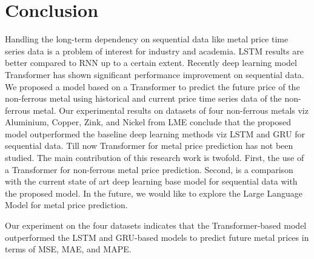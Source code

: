 \documentclass[preprint,12pt]{elsarticle}
\begin{document}
\section{Conclusion}
Handling the long-term dependency on sequential data like metal price time series data is a problem of interest for industry and academia. LSTM results are better compared to RNN up to a certain extent. Recently deep learning model Transformer has shown significant performance improvement on sequential data. We proposed a model based on a Transformer to predict the future price of the non-ferrous metal using historical and current price time series data of the non-ferrous metal. Our experimental results on datasets of four non-ferrous metals viz Aluminium, Copper, Zink, and Nickel from LME conclude that the proposed model outperformed the baseline deep learning methods viz LSTM and GRU for sequential data. Till now Transformer for metal price prediction has not been studied. The main contribution of this research work is twofold. First, the use of a Transformer for non-ferrous metal price prediction. Second, is a comparison with the current state of art deep learning base model for sequential data with the proposed model. In the future, we would like to explore the Large Language Model for metal price prediction.  
\par Our experiment on the four datasets indicates that the Transformer-based model outperformed the LSTM and GRU-based models to predict future metal prices in terms of MSE, MAE, and MAPE.

 
\end{document}

